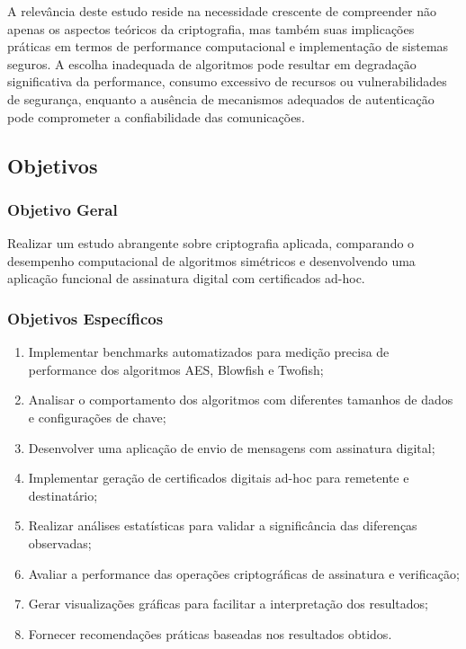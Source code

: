 \documentclass[12pt,a4paper,oneside]{article}
\begin{document}
A relevância deste estudo reside na necessidade crescente de compreender não apenas os aspectos teóricos da criptografia, mas também suas implicações práticas em termos de performance computacional e implementação de sistemas seguros. A escolha inadequada de algoritmos pode resultar em degradação significativa da performance, consumo excessivo de recursos ou vulnerabilidades de segurança, enquanto a ausência de mecanismos adequados de autenticação pode comprometer a confiabilidade das comunicações.

\subsection{Objetivos}

\subsubsection{Objetivo Geral}

Realizar um estudo abrangente sobre criptografia aplicada, comparando o desempenho computacional de algoritmos simétricos e desenvolvendo uma aplicação funcional de assinatura digital com certificados ad-hoc.

\subsubsection{Objetivos Específicos}

\begin{enumerate}
    \item Implementar benchmarks automatizados para medição precisa de performance dos algoritmos AES, Blowfish e Twofish;
    \item Analisar o comportamento dos algoritmos com diferentes tamanhos de dados e configurações de chave;
    \item Desenvolver uma aplicação de envio de mensagens com assinatura digital;
    \item Implementar geração de certificados digitais ad-hoc para remetente e destinatário;
    \item Realizar análises estatísticas para validar a significância das diferenças observadas;
    \item Avaliar a performance das operações criptográficas de assinatura e verificação;
    \item Gerar visualizações gráficas para facilitar a interpretação dos resultados;
    \item Fornecer recomendações práticas baseadas nos resultados obtidos.
\end{enumerate}
\end{document}
